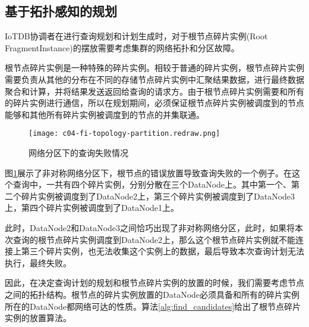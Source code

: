 \subsection{基于拓扑感知的规划}

IoTDB协调者在进行查询规划和计划生成时，对于根节点碎片实例(Root FragmentInstance)的摆放需要考虑集群的网络拓扑和分区故障。

根节点碎片实例是一种特殊的碎片实例。相较于普通的碎片实例，根节点碎片实例需要负责从其他的分布在不同的存储节点碎片实例中汇聚结果数据，进行最终数据聚合和计算，并将结果发送返回给查询的请求方。由于根节点碎片实例需要和所有的碎片实例进行通信，所以在规划期间，必须保证根节点碎片实例被调度到的节点能够和其他所有碎片实例被调度到的节点的并集联通。


\begin{figure}
  \centering
  \texttt{[image: c04-fi-topology-partition.redraw.png]}
  \caption{网络分区下的查询失败情况}
  \label{fig:fi-topology-partition}
\end{figure}

图\ref{fig:fi-topology-partition}展示了非对称网络分区下，根节点的错误放置导致查询失败的一个例子。在这个查询中，一共有四个碎片实例，分别分散在三个DataNode上。其中第一个、第二个碎片实例被调度到了DataNode2上，第三个碎片实例被调度到了DataNode3上，第四个碎片实例被调度到了DataNode1上。

此时，DataNode2和DataNode3之间恰巧出现了非对称网络分区，此时，如果将本次查询的根节点碎片实例调度到DataNode2上，那么这个根节点碎片实例就不能连接上第三个碎片实例，也无法收集这个实例上的数据，最后导致本次查询计划无法执行，最终失败。

因此，在决定查询计划的规划和根节点碎片实例的放置的时候，我们需要考虑节点之间的拓扑结构。根节点的碎片实例放置的DataNode必须具备和所有的碎片实例所在的DataNode都网络可达的性质。算法\ref{alg:find_candidates}给出了根节点碎片实例的放置算法。


